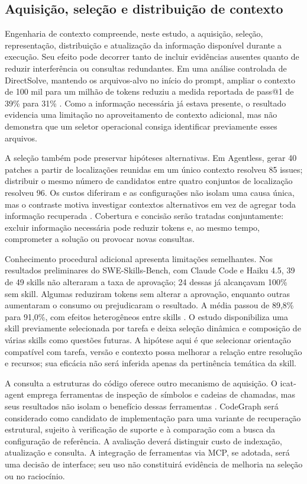 \subsection{Aquisição, seleção e distribuição de contexto}

Engenharia de contexto compreende, neste estudo, a aquisição, seleção, representação, distribuição e atualização da informação disponível durante a execução. Seu efeito pode decorrer tanto de incluir evidências ausentes quanto de reduzir interferência ou consultas redundantes. Em uma análise controlada de DirectSolve, mantendo os arquivos-alvo no início do prompt, ampliar o contexto de 100 mil para um milhão de tokens reduziu a medida reportada de pass@1 de 39\% para 31\% \cite{Jiang2025LCLM}. Como a informação necessária já estava presente, o resultado evidencia uma limitação no aproveitamento de contexto adicional, mas não demonstra que um seletor operacional consiga identificar previamente esses arquivos.

A seleção também pode preservar hipóteses alternativas. Em Agentless, gerar 40 patches a partir de localizações reunidas em um único contexto resolveu 85 issues; distribuir o mesmo número de candidatos entre quatro conjuntos de localização resolveu 96. Os custos diferiram e as configurações não isolam uma causa única, mas o contraste motiva investigar contextos alternativos em vez de agregar toda informação recuperada \cite{Xia2024Agentless}. Cobertura e concisão serão tratadas conjuntamente: excluir informação necessária pode reduzir tokens e, ao mesmo tempo, comprometer a solução ou provocar novas consultas.

Conhecimento procedural adicional apresenta limitações semelhantes. Nos resultados preliminares do SWE-Skills-Bench, com Claude Code e Haiku 4.5, 39 de 49 skills não alteraram a taxa de aprovação; 24 dessas já alcançavam 100\% sem skill. Algumas reduziram tokens sem alterar a aprovação, enquanto outras aumentaram o consumo ou prejudicaram o resultado. A média passou de 89,8\% para 91,0\%, com efeitos heterogêneos entre skills \cite{Han2026SWESkills}. O estudo disponibiliza uma skill previamente selecionada por tarefa e deixa seleção dinâmica e composição de várias skills como questões futuras. A hipótese aqui é que selecionar orientação compatível com tarefa, versão e contexto possa melhorar a relação entre resolução e recursos; sua eficácia não será inferida apenas da pertinência temática da skill.

A consulta a estruturas do código oferece outro mecanismo de aquisição. O icat-agent emprega ferramentas de inspeção de símbolos e cadeias de chamadas, mas seus resultados não isolam o benefício dessas ferramentas \cite{Chen2026IcatAgent}. CodeGraph será considerado como candidato de implementação para uma variante de recuperação estrutural, sujeito à verificação de suporte e à comparação com a busca da configuração de referência. A avaliação deverá distinguir custo de indexação, atualização e consulta. A integração de ferramentas via MCP, se adotada, será uma decisão de interface; seu uso não constituirá evidência de melhoria na seleção ou no raciocínio.

